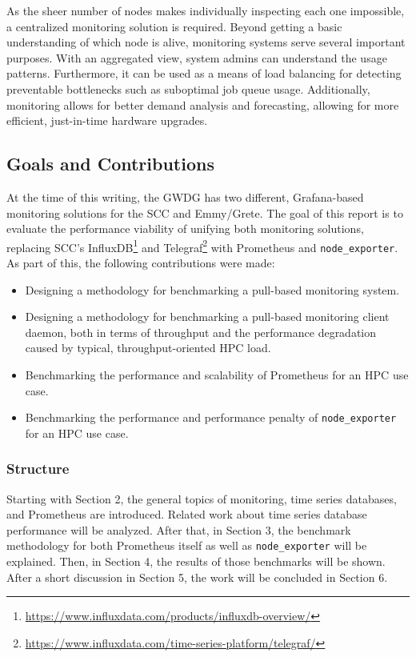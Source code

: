 As the sheer number of nodes makes individually inspecting each one impossible, a centralized
monitoring solution is required. Beyond getting a basic understanding of which node is alive, 
monitoring systems serve several important purposes. With an aggregated view, system admins can
understand the usage patterns. Furthermore, it can be used as a means of load balancing 
for detecting preventable bottlenecks such as suboptimal job queue usage. Additionally, monitoring
allows for better demand analysis and forecasting, allowing for more efficient, just-in-time 
hardware upgrades.

\subsection{Goals and Contributions}

At the time of this writing, the GWDG has two different, Grafana-based monitoring solutions for 
the \ac{SCC} and Emmy/Grete. The goal of this report is to evaluate the performance viability of
unifying both monitoring solutions, replacing \ac{SCC}'s InfluxDB\footnote{
\url{https://www.influxdata.com/products/influxdb-overview/}} and Telegraf\footnote{
\url{https://www.influxdata.com/time-series-platform/telegraf/}} with Prometheus and 
\texttt{node\_exporter}.
As part of this, the following contributions were made:
\begin{itemize}
\item Designing a methodology for benchmarking a pull-based monitoring system.
\item Designing a methodology for benchmarking a pull-based monitoring client daemon, both in 
terms of throughput and the performance degradation caused by typical, throughput-oriented 
\ac{HPC} load.
\item Benchmarking the performance and scalability of Prometheus for an \ac{HPC} use case.
\item Benchmarking the performance and performance penalty of \texttt{node\_exporter} for an 
\ac{HPC} use case.
\end{itemize}

\subsubsection{Structure}
Starting with Section 2, the general topics of monitoring, time series databases, and
Prometheus are introduced. Related work about time series database performance will be analyzed.
After that, in Section 3, the benchmark methodology for both Prometheus itself as well as
\texttt{node\_exporter} will be explained. Then, in Section 4, the results of those benchmarks
will be shown. After a short discussion in Section 5, the work will be concluded in Section 6.

